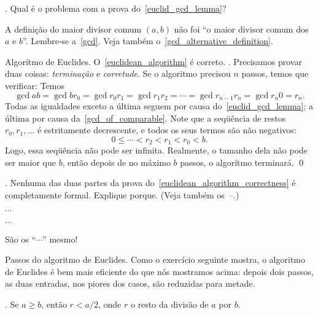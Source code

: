 \exercise.
\label{what_is_the_problem_with_euclid_gcd_lemma}%
Qual é o problema com a prova do~\ref{euclid_gcd_lemma}?

\solution
A definição do maior divisor comum $(a,b)$ não foi
``o maior divisor comum dos $a$ e $b$''.
Lembre-se a~\ref{gcd}.
Veja também o~\ref{gcd_alternative_definition}.

\endexercise

\theorem Algorítmo de Euclides.
\label{euclidean_algorithm_correctness}%
O~\ref{euclidean_algorithm} é correto.
\proof.
Precisamos provar duas coisas: \emph{terminação\/}\/ e \emph{corretude}.
\endgraf
{}
Se o algoritmo precisou $n$ passos, temos que verificar:
Temos
$$
\gcd a b
= \gcd b {r_0}
= \gcd {r_0} {r_1}
= \gcd {r_1} {r_2}
= \dotsb
= \gcd {r_{n-1}} {r_n}
= \gcd {r_n} 0
= r_n.
$$
Todas as igualdades exceto a última seguem por causa do~\ref{euclid_gcd_lemma};
a última por causa da~\ref{gcd_of_comparable}.
\endgraf
{}
Note que a seqüência de restos $r_0, r_1, \ldots$ é estritamente
decrescente, e todos os seus termos são não negativos:
$$
0\leq \dotsb < r_2 < r_1 < r_0 < b.
$$
Logo, essa seqüência não pode ser infinita.
Realmente, o tamanho dela não pode ser maior que $b$,
então depois de no máximo $b$ passos, o algorítmo terminará.
\qed

\exercise.
\label{euclidean_algorithm_proof_why_informal}%
Nenhuma das duas partes da prova do~\ref{euclidean_algorithm_correctness}
é completamente formal.  Explique porque.
(Veja também os~--.)

\hint ${}\dotsb{}$

\hint ${}\dotsb{}$

\solution
São os ``${}\dotsb{}$'' mesmo!

\endexercise

\note Passos do algoritmo de Euclides.
Como o exercício seguinte mostra, o algoritmo de Euclides
é bem mais eficiente do que nós mostramos acima:
depois dois passos, as duas entradas, nos piores dos casos,
são reduzidas para metade.

\exercise.
\label{less_steps_in_euclid}%
Se $a \geq b$, então $r < a/2$, onde $r$ o resto da divisão de $a$ por $b$.

